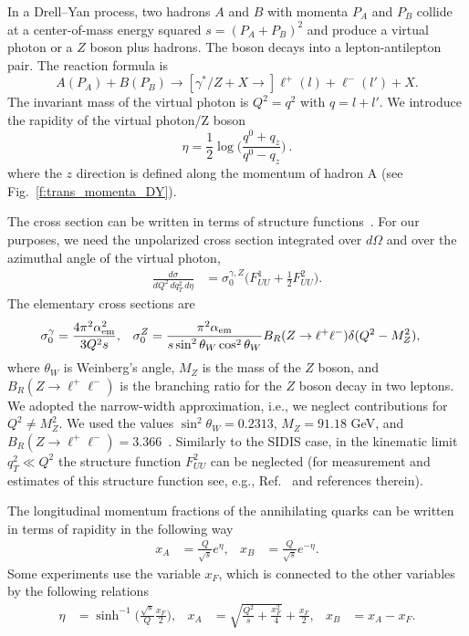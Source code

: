 \documentclass[aps,preprintnumbers,showpacs,nofootinbib,superscriptaddress,floatfix]{revtex4}
\begin{document}
In a Drell--Yan process, two hadrons $A$ and $B$ with momenta $P_A$ and $P_B$
collide at a center-of-mass energy squared $s = (P_A + P_B)^2$ 
and produce a virtual photon or a $Z$ boson plus hadrons. 
The boson decays into a
lepton-antilepton pair. The reaction formula is
\begin{equation}
A(P_A)+B(P_B)\to [\gamma^*/Z + X \to] \ell^+(l) + \ell^-(l') + X.
\end{equation} 
The invariant mass of the virtual photon is $Q^2=q^2$ with $q = l + l'$. 
We introduce the rapidity of the virtual photon/Z boson
\begin{equation}
\eta=\frac{1}{2}\log\bigg(\frac{q^0+q_z}{q^0-q_z}\bigg)\  .
\end{equation} 
where the $z$ direction is defined along the momentum of hadron A (see Fig.~\ref{f:trans_momenta_DY}).

The cross section can be written in terms of structure
functions~\cite{Boer:2006eq,Arnold:2008kf}. For our purposes, we need the unpolarized 
cross section
integrated over $d\Omega$ and over the azimuthal angle of the virtual photon, 
\begin{align}
\label{e:dsigma_gZ}
\frac{d\sigma}{dQ^2\, dq_T^2\,d\eta} &= \sigma_0^{\gamma,Z}
\bigg(F_{UU}^1 + \frac{1}{2} F_{UU}^2\bigg). 
\end{align} 
The elementary cross sections are
\begin{align}
\sigma_0^{\gamma} &= \frac{4\pi^2 \alpha^2_{\rm em}}{3 Q^2 s},
&
\sigma_0^Z &= 
\frac{\pi^2 \alpha_{\rm em}}{s \sin^2{\theta_W} \cos^2{\theta_W}}
B_R(Z\rightarrow \ell^+\ell^-)
\delta(Q^2 - M_Z^2), 
\label{e:elem_cs_sig0}
\end{align} 
where $\theta_W$ is Weinberg's angle, $M_Z$ is the mass of the $Z$ boson, and
$B_R(Z\rightarrow \ell^+\ell^-)$ 
is the branching ratio for the $Z$ boson decay in two leptons.
We adopted the narrow-width approximation, i.e., we neglect contributions for 
$Q^2 \neq M_Z^2$. 
We used the values 
$\sin^2 \theta_W= 0.2313$, $M_Z = 91.18$ GeV, and 
$B_R(Z\rightarrow \ell^+\ell^-)=3.366$~\cite{Olive:2016xmw}.  
Similarly to the SIDIS case, in the kinematic limit $q_T^2 \ll Q^2$ 
the structure function $F_{UU}^2$ can be neglected 
(for measurement and estimates of this
structure function see, e.g.,
Ref.~\cite{Lambertsen:2016wgj} and references therein). 

The longitudinal momentum fractions of the annihilating quarks
can be written in terms of
rapidity in the following way 
\begin{align}
x_A &= \frac{Q}{\sqrt{s}} e^{\eta},
&
x_B &= \frac{Q}{\sqrt{s}} e^{-\eta}.
\label{xab}
\end{align} 
Some experiments use the variable $x_F$, which is connected to the other
variables  by the following relations
\begin{align}
\label{e:eta_xf}
\eta &= \sinh^{-1}\bigg(\frac{\sqrt{s}}{Q}\frac{x_F}{2}\bigg),
& 
x_{A} &= \sqrt{\frac{Q^2}{s} + \frac{x_F^2}{4}} + \frac{x_F}{2},
&
x_B &= x_A - x_F.  
\end{align} 
\end{document}
